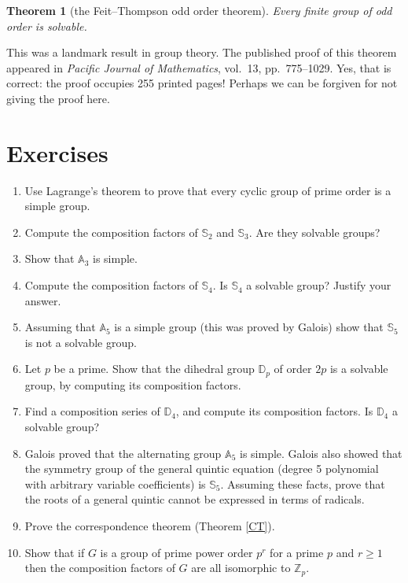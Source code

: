 \documentclass[11pt,oneside]{article}
\newenvironment{problems}
{
 \begin{enumerate}[topsep=1pt,itemsep=0pt,parsep=2pt,leftmargin=0.6cm,%
 label={\arabic*.}, ref=\arabic*] \small
}
{
 \end{enumerate}
}
\newtheorem{thm}{Theorem}[section]
\theoremstyle{definition}
\newcommand{\Z}{\mathbb{Z}} %
\newcommand{\Sym}{\mathbb{S}}
\newcommand{\Alt}{\mathbb{A}}
\newcommand{\D}{\mathbb{D}}
\begin{document}
\begin{thm}[the Feit--Thompson odd order theorem]
% 
  Every finite group of odd order is solvable.
\end{thm}

This was a landmark result in group theory.  The published proof of
this theorem appeared in {\em Pacific Journal of Mathematics},
vol.\ 13, pp.\ 775--1029. Yes, that is correct: the proof occupies 255
printed pages! Perhaps we can be forgiven for not giving the proof here.




\section*{Exercises}
\begin{problems}

\item Use Lagrange's theorem to prove that every cyclic group of prime
  order is a simple group.

\item Compute the composition factors of $\Sym_2$ and $\Sym_3$. Are
  they solvable groups?

\item Show that $\Alt_3$ is simple. 

\item Compute the composition factors of $\Sym_4$. Is $\Sym_4$ a
  solvable group? Justify your answer.

\item Assuming that $\Alt_5$ is a simple group (this was proved by
  Galois) show that $\Sym_5$ is not a solvable group. 

\item Let $p$ be a prime. Show that the dihedral group $\D_p$ of order
  $2p$ is a solvable group, by computing its composition factors.

\item Find a composition series of $\D_4$, and compute its composition
  factors. Is $\D_4$ a solvable group? 


\item \label{ex:quintic} Galois proved that the alternating group
  $\Alt_5$ is simple. Galois also showed that the symmetry group of
  the general quintic equation (degree 5 polynomial with arbitrary
  variable coefficients) is $\Sym_5$. Assuming these facts, prove that
  the roots of a general quintic cannot be
  expressed in terms of radicals.

\item Prove the correspondence theorem (Theorem \ref{CT}).

\item Show that if $G$ is a group of prime power order $p^r$ for a
  prime $p$ and $r \ge 1$ then the composition factors of $G$ are all
  isomorphic to $\Z_p$.

\end{problems}
\end{document}
